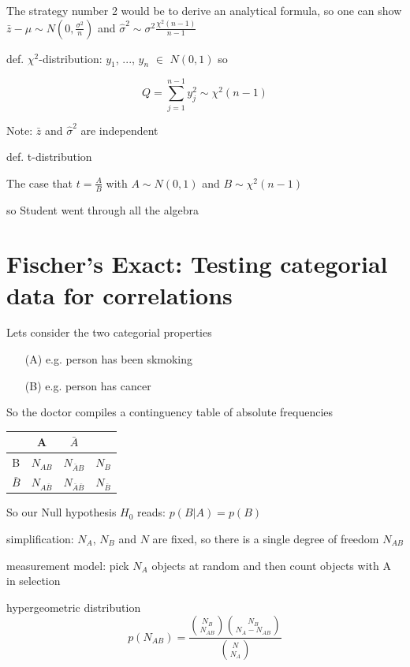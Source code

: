 \documentclass{notebook}
\begin{document}
The strategy number 2 would be to derive an analytical formula, so one can show $\bar{z}-\mu \sim N(0,\frac{\sigma^2}{n})$ and $\hat{\sigma}^2 \sim \sigma^2 \frac{\chi^2(n-1)}{n-1}$

def. $\chi^2$-distribution: $y_1$, ..., $y_n$ $\in$ $N(0,1)$ so

%
\begin{equation}
	Q = \sum_{j=1}^{n-1} y_j^2 \sim \chi^2(n-1)
\end{equation}
%

Note: $\bar{z}$ and $\hat{\sigma}^2$ are independent

def. t-distribution

The case that $t = \frac{A}{B}$ with $A \sim N(0,1)$ and $B \sim \chi^2(n-1)$

so Student went through all the algebra

\section{Fischer's Exact: Testing categorial data for correlations}

Lets consider the two categorial properties
%
\begin{itemize}
	\item[(A)]{e.g. person has been skmoking}
	\item[(B)]{e.g. person has cancer}
\end{itemize}
%

So the doctor compiles a continguency table of absolute frequencies

%
\begin{tabular}{c | c | c | c}
			& A 				& $\bar{A}$ 			& \\ \hline
B 			& $N_{AB}$ 			& $N_{\bar{A}B}$ 		& $N_B$ \\
$\bar{B}$ 	&	$N_{A\bar{B}}$ 	& $N_{\bar{A}\bar{B}}$ 	& $N_{\bar{B}}$
\end{tabular}
%

So our Null hypothesis $H_0$ reads: $p(B|A) = p(B)$

simplification: $N_A$, $N_B$ and $N$ are fixed, so there is a single degree of freedom $N_{AB}$

measurement model: pick $N_A$ objects at random and then count objects with A in selection

hypergeometric distribution
%
\begin{equation}
	p(N_{AB}) = \frac{\binom{N_B}{N_{AB}} \binom{N_B}{N_A-N_{AB}}}{\binom{N}{N_A}}
\end{equation}
%
\end{document}
